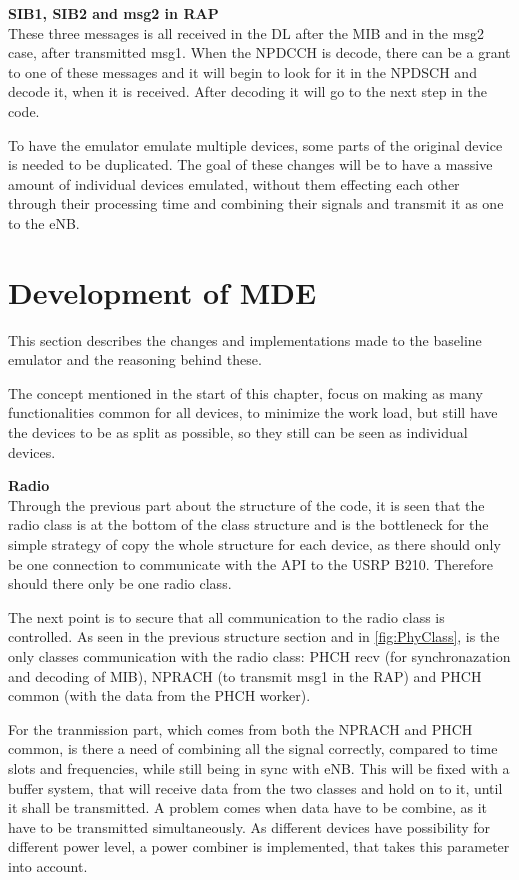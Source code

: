 \textbf{SIB1, SIB2 and msg2 in RAP} \\
These three messages is all received in the DL after the MIB and in the msg2 case, after transmitted msg1. When the NPDCCH is decode, there can be a grant to one of these messages and it will begin to look for it in the NPDSCH and decode it, when it is received. After decoding it will go to the next step in the code.







To have the emulator emulate multiple devices, some parts of the original device is needed to be duplicated. The goal of these changes will be to have a massive amount of individual devices emulated, without them effecting each other through their processing time and combining their signals and transmit it as one to the eNB.

\section{Development of MDE}
\label{sec:Changes}
This section describes the changes and implementations made to the baseline emulator and the reasoning behind these.

The concept mentioned in the start of this chapter, focus on making as many functionalities common for all devices, to minimize the work load, but still have the devices to be as split as possible, so they still can be seen as individual devices.

\textbf{Radio}\\
Through the previous part about the structure of the code, it is seen that the radio class is at the bottom of the class structure and is the bottleneck for the simple strategy of copy the whole structure for each device, as there should only be one connection to communicate with the API to the USRP B210. Therefore should there only be one radio class.

The next point is to secure that all communication to the radio class is controlled. As seen in the previous structure section and in \autoref{fig:PhyClass}, is the only classes communication with the radio class: PHCH recv (for synchronazation and decoding of MIB), NPRACH (to transmit msg1 in the RAP) and PHCH common (with the data from the PHCH worker).

For the tranmission part, which comes from both the NPRACH and PHCH common, is there a need of combining all the signal correctly, compared to time slots and frequencies, while still being in sync with eNB. This will be fixed with a buffer system, that will receive data from the two classes and hold on to it, until it shall be transmitted. A problem comes when data have to be combine, as it have to be transmitted simultaneously. As different devices have possibility for different power level, a power combiner is implemented, that takes this parameter into account.

